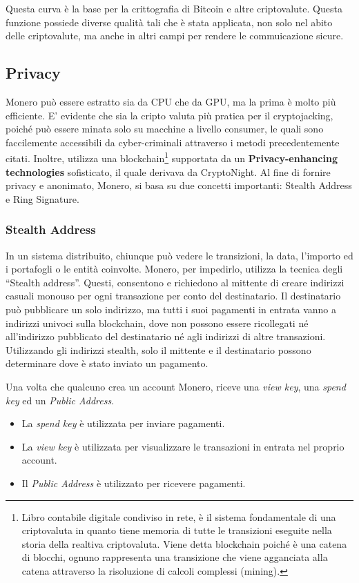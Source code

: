 \documentclass[12pt,a4paper]{article}
\begin{document}
Questa curva è la base per la crittografia di Bitcoin e altre criptovalute.
Questa funzione possiede diverse qualità tali che è stata applicata, non solo 
nel abito delle criptovalute, ma anche in altri campi per rendere le commuicazione
sicure. 

\subsection{Privacy}

Monero può essere estratto sia da CPU che da GPU, ma la prima è molto più
efficiente. E' evidente che sia la cripto valuta più pratica per il
cryptojacking, poiché può essere minata solo su macchine a livello consumer, le
quali sono faccilemente accessibili da cyber-criminali attraverso i metodi
precedentemente citati. Inoltre, utilizza una blockchain\footnote{Libro
contabile digitale condiviso in rete, è il sistema fondamentale di una
criptovaluta in quanto tiene memoria di tutte le transizioni eseguite nella
storia della realtiva criptovaluta. Viene detta blockchain poiché è una catena
di blocchi, ognuno rappresenta una transizione che viene agganciata alla catena
attraverso la risoluzione di calcoli complessi (mining).} supportata da un
\textbf{Privacy-enhancing technologies} sofisticato, il quale derivava da
CryptoNight. Al fine di fornire privacy e anonimato, Monero, si basa su due
concetti importanti: Stealth Address e Ring Signature.
\subsubsection{Stealth Address}
    In un sistema distribuito, chiunque può vedere le transizioni, la data,
    l'importo ed i portafogli o le entità coinvolte. Monero, per impedirlo,
    utilizza la tecnica degli “Stealth address”. Questi, consentono e richiedono
    al mittente di creare indirizzi casuali monouso per ogni transazione per
    conto del destinatario. Il destinatario può pubblicare un solo indirizzo, ma
    tutti i suoi pagamenti in entrata vanno a indirizzi univoci sulla
    blockchain, dove non possono essere ricollegati né all'indirizzo pubblicato
    del destinatario né agli indirizzi di altre transazioni. Utilizzando gli
    indirizzi stealth, solo il mittente e il destinatario possono determinare
    dove è stato inviato un pagamento.

    Una volta che qualcuno crea un account Monero, riceve una \textit{view key},
    una \textit{spend key} ed un \textit{Public Address}. 
    \begin{itemize}
        \item La \textit{spend key} è utilizzata per inviare pagamenti.
        \item La \textit{view key} è utilizzata per visualizzare le transazioni
        in entrata nel proprio account.
        \item Il \textit{Public Address} è utilizzato per ricevere pagamenti.
    \end{itemize}
\end{document}
